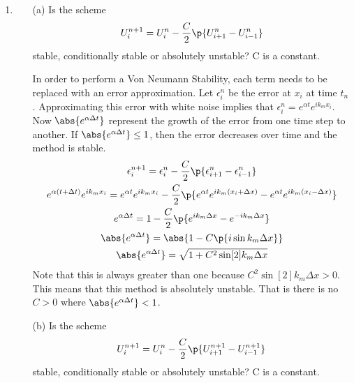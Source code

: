 \documentclass[11pt, oneside]{article}
\begin{document}
\begin{enumerate}
  \item %
    \begin{enumerate}
      \item[(a)] %
        Is the scheme
        \[
          U_i^{n+1} = U_i^n - \frac{C}{2} \p{U_{i+1}^n - U_{i-1}^n}
        \]
        stable, conditionally stable or absolutely unstable?
        C is a constant.

        In order to perform a Von Neumann Stability, each term needs to be
        replaced with an error approximation.
        Let $\epsilon^n_i$ be the error at $x_i$ at time $t_n$.
        Approximating this error with white noise implies that
        $\epsilon^n_i = e^{\alpha t} e^{i k_m x_i}$.
        Now $\abs{e^{\alpha \Delta t}}$ represent the growth of the error from
        one time step to another.
        If $\abs{e^{\alpha \Delta t}} \le 1$, then the error decreases over time
        and the method is stable.
        \begin{gather}
          \epsilon^{n+1}_i = \epsilon_i^n - \frac{C}{2} \p{\epsilon_{i+1}^n - \epsilon_{i-1}^n} \\
          e^{\alpha (t + \Delta t)} e^{i k_m x_i} = e^{\alpha t} e^{i k_m x_i} - \frac{C}{2} \p{e^{\alpha t} e^{i k_m (x_i + \Delta x)} - e^{\alpha t} e^{i k_m (x_i - \Delta x)}} \\
          e^{\alpha \Delta t} = 1 - \frac{C}{2} \p{e^{i k_m \Delta x} -  e^{-i k_m \Delta x}} \\
          \abs{e^{\alpha \Delta t}} = \abs{1 - C \p{i \sin{k_m \Delta x}}} \\
          \abs{e^{\alpha \Delta t}} = \sqrt{1 + C^2 \sin[2]{k_m \Delta x}} \\
        \end{gather}
        Note that this is always greater than one because $C^2 \sin[2]{k_m \Delta x} > 0$.
        This means that this method is absolutely unstable.
        That is there is no $C > 0$ where $\abs{e^{\alpha \Delta t}} < 1$.

      \item[(b)] %
        Is the scheme
        \[
          U_i^{n+1} = U_i^n - \frac{C}{2} \p{U_{i+1}^{n+1} - U_{i-1}^{n+1}}
        \]
        stable, conditionally stable or absolutely unstable?
        C is a constant.


\end{enumerate}
\end{enumerate}
\end{document}
